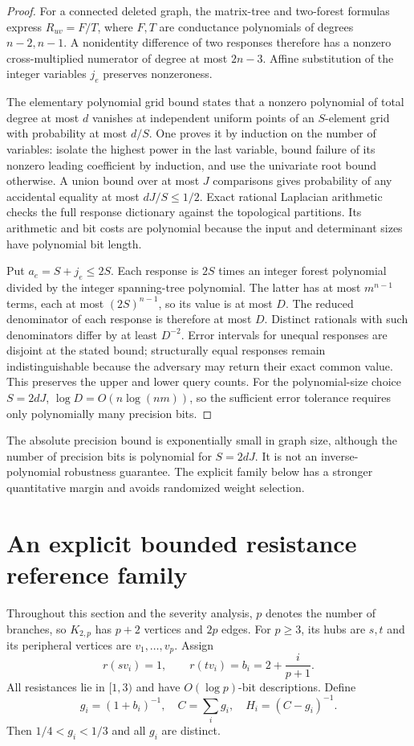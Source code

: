 \documentclass[11pt,letterpaper]{article}
\begin{document}
\begin{proof}
For a connected deleted graph, the matrix-tree and two-forest formulas express $R_{uv}=F/T$, where $F,T$ are conductance polynomials of degrees $n-2,n-1$. A nonidentity difference of two responses therefore has a nonzero cross-multiplied numerator of degree at most $2n-3$. Affine substitution of the integer variables $j_e$ preserves nonzeroness.

The elementary polynomial grid bound states that a nonzero polynomial of total degree at most $d$ vanishes at independent uniform points of an $S$-element grid with probability at most $d/S$. One proves it by induction on the number of variables: isolate the highest power in the last variable, bound failure of its nonzero leading coefficient by induction, and use the univariate root bound otherwise. A union bound over at most $J$ comparisons gives probability of any accidental equality at most $dJ/S\le1/2$. Exact rational Laplacian arithmetic checks the full response dictionary against the topological partitions. Its arithmetic and bit costs are polynomial because the input and determinant sizes have polynomial bit length.

Put $a_e=S+j_e\le2S$. Each response is $2S$ times an integer forest polynomial divided by the integer spanning-tree polynomial. The latter has at most $m^{n-1}$ terms, each at most $(2S)^{n-1}$, so its value is at most $D$. The reduced denominator of each response is therefore at most $D$. Distinct rationals with such denominators differ by at least $D^{-2}$. Error intervals for unequal responses are disjoint at the stated bound; structurally equal responses remain indistinguishable because the adversary may return their exact common value. This preserves the upper and lower query counts.
For the polynomial-size choice $S=2dJ$, $\log D=O(n\log(nm))$, so the sufficient error tolerance requires only polynomially many precision bits.
\end{proof}

The absolute precision bound is exponentially small in graph size, although the number of precision bits is polynomial for $S=2dJ$. It is not an inverse-polynomial robustness guarantee. The explicit family below has a stronger quantitative margin and avoids randomized weight selection.

\section{An explicit bounded resistance reference family}\label{sec:weighted}
Throughout this section and the severity analysis, $p$ denotes the number of branches, so $K_{2,p}$ has $p+2$ vertices and $2p$ edges. For $p\ge3$, its hubs are $s,t$ and its peripheral vertices are $v_1,\ldots,v_p$. Assign
\[
 r(sv_i)=1,\qquad r(tv_i)=b_i=2+\frac{i}{p+1}.
\]
All resistances lie in $[1,3)$ and have $O(\log p)$-bit descriptions. Define
\[
 g_i=(1+b_i)^{-1},\quad C=\sum_i g_i,\quad
 H_i=(C-g_i)^{-1}.
\]
Then $1/4<g_i<1/3$ and all $g_i$ are distinct.
\end{document}
